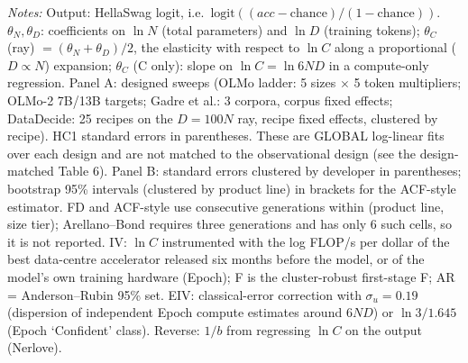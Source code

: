 \begin{table}[!htbp]
\begin{threeparttable}
\begin{tablenotes}[flushleft]
\item \textit{Notes:} Output: HellaSwag logit, i.e.\ $\text{logit}((acc-\text{chance})/(1-\text{chance}))$. $\theta_N,\theta_D$: coefficients on $\ln N$ (total parameters) and $\ln D$ (training tokens); $\theta_C$ (ray) $=(\theta_N+\theta_D)/2$, the elasticity with respect to $\ln C$ along a proportional ($D\propto N$) expansion; $\theta_C$ (C only): slope on $\ln C=\ln 6ND$ in a compute-only regression. Panel A: designed sweeps (OLMo ladder: 5 sizes $\times$ 5 token multipliers; OLMo-2 7B/13B targets; Gadre et al.: 3 corpora, corpus fixed effects; DataDecide: 25 recipes on the $D=100N$ ray, recipe fixed effects, clustered by recipe). HC1 standard errors in parentheses. These are GLOBAL log-linear fits over each design and are not matched to the observational design (see the design-matched Table 6). Panel B: standard errors clustered by developer in parentheses; bootstrap 95\% intervals (clustered by product line) in brackets for the ACF-style estimator. FD and ACF-style use consecutive generations within (product line, size tier); Arellano--Bond requires three generations and has only 6 such cells, so it is not reported. IV: $\ln C$ instrumented with the log FLOP/s per dollar of the best data-centre accelerator released six months before the model, or of the model's own training hardware (Epoch); F is the cluster-robust first-stage F; AR = Anderson--Rubin 95\% set. EIV: classical-error correction with $\sigma_u=0.19$ (dispersion of independent Epoch compute estimates around $6ND$) or $\ln 3/1.645$ (Epoch `Confident' class). Reverse: $1/b$ from regressing $\ln C$ on the output (Nerlove).
\end{tablenotes}
\end{threeparttable}
\end{table}
